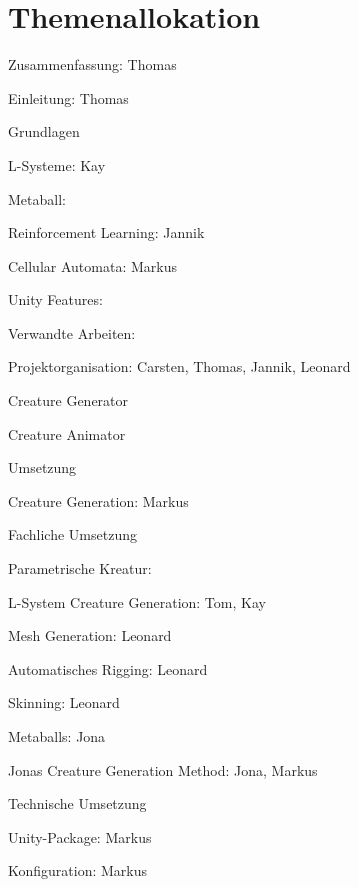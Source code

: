 \chapter*{Themenallokation} 

\begin{thallok}
	\item Zusammenfassung: Thomas
	\item Einleitung: Thomas
	\item Grundlagen
	\begin{thallok}
		\item L-Systeme: Kay
		\item Metaball: 
		\item Reinforcement Learning: Jannik
		\item Cellular Automata: Markus
		\item Unity Features: 		
	\end{thallok}
	\item Verwandte Arbeiten: 
	\item Projektorganisation: Carsten, Thomas, Jannik, Leonard
	\begin{thallok}
		\item Creature Generator
		\item Creature Animator
	\end{thallok}
	\item Umsetzung
	\begin{thallok}
		\item Creature Generation: Markus
		\begin{thallok}
			\item Fachliche Umsetzung
				\begin{thallok}
					\item Parametrische Kreatur:
					\item L-System Creature Generation: Tom, Kay
					\item Mesh Generation: Leonard
					\item Automatisches Rigging: Leonard
					\item Skinning: Leonard
					\item Metaballs: Jona
					\item Jonas Creature Generation Method: Jona, Markus
				\end{thallok}
			\item Technische Umsetzung
				\begin{thallok}
					\item Unity-Package: Markus
					\item Konfiguration: Markus

\end{thallok}
\end{thallok}
\end{thallok}
\end{thallok}
